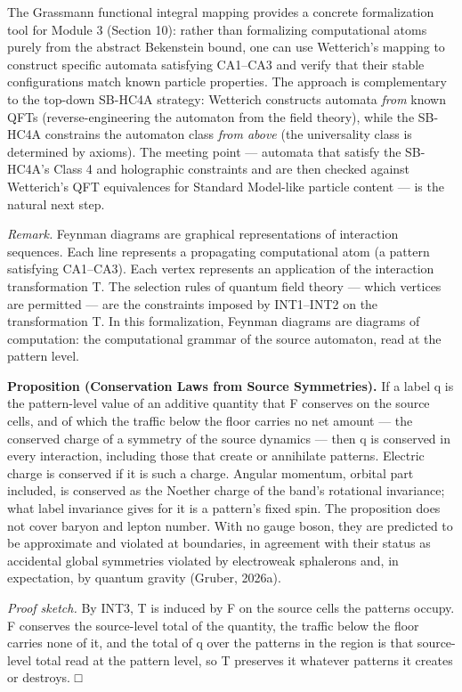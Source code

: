 \documentclass[
]{article}
\begin{document}
The Grassmann functional integral mapping provides a concrete
formalization tool for Module 3 (Section 10): rather than formalizing
computational atoms purely from the abstract Bekenstein bound, one can
use Wetterich's mapping to construct specific automata satisfying
CA1--CA3 and verify that their stable configurations match known
particle properties. The approach is complementary to the top-down
SB-HC4A strategy: Wetterich constructs automata \emph{from} known QFTs
(reverse-engineering the automaton from the field theory), while the
SB-HC4A constrains the automaton class \emph{from above} (the
universality class is determined by axioms). The meeting point ---
automata that satisfy the SB-HC4A's Class 4 and holographic constraints
and are then checked against Wetterich's QFT equivalences for Standard
Model-like particle content --- is the natural next step.

\emph{Remark.} Feynman diagrams are graphical representations of
interaction sequences. Each line represents a propagating computational
atom (a pattern satisfying CA1--CA3). Each vertex represents an
application of the interaction transformation T. The selection rules of
quantum field theory --- which vertices are permitted --- are the
constraints imposed by INT1--INT2 on the transformation T. In this
formalization, Feynman diagrams are diagrams of computation: the
computational grammar of the source automaton, read at the pattern
level.

\textbf{Proposition (Conservation Laws from Source Symmetries).} If a
label q is the pattern-level value of an additive quantity that F
conserves on the source cells, and of which the traffic below the floor
carries no net amount --- the conserved charge of a symmetry of the
source dynamics --- then q is conserved in every interaction, including
those that create or annihilate patterns. Electric charge is conserved
if it is such a charge. Angular momentum, orbital part included, is
conserved as the Noether charge of the band's rotational invariance;
what label invariance gives for it is a pattern's fixed spin. The
proposition does not cover baryon and lepton number. With no gauge
boson, they are predicted to be approximate and violated at boundaries,
in agreement with their status as accidental global symmetries violated
by electroweak sphalerons and, in expectation, by quantum gravity
(Gruber, 2026a).

\emph{Proof sketch.} By INT3, T is induced by F on the source cells the
patterns occupy. F conserves the source-level total of the quantity, the
traffic below the floor carries none of it, and the total of q over the
patterns in the region is that source-level total read at the pattern
level, so T preserves it whatever patterns it creates or destroys. □
\end{document}
